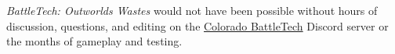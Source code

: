 \emph{BattleTech: Outworlds Wastes} would not have been possible without hours of discussion, questions, and editing on the \href{https://coloradobt.org}{Colorado BattleTech} Discord server or the months of gameplay and testing.

